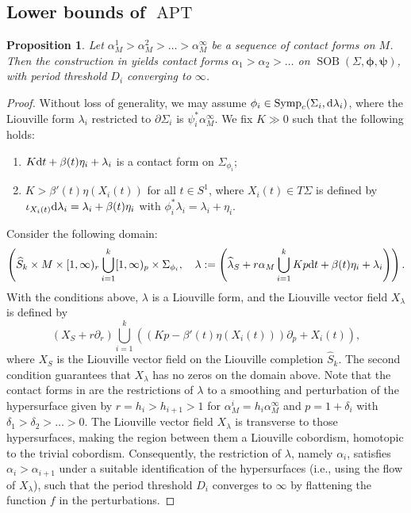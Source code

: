 \documentclass[11pt]{amsart}
\numberwithin{equation}{section}
\newtheorem{proposition}[theorem]{\textbf{Proposition}}
\def\rd{{\rm d}}
\DeclareMathOperator{\APT}{APT}
\DeclareMathOperator{\symp}{Symp}
\DeclareMathOperator{\SOB}{SOB}
\begin{document}
\subsection{Lower bounds of $\APT$}
\begin{proposition}\label{prop:filtration}
    Let $\alpha^1_M>\alpha^2_M>\ldots >\alpha^\infty_M$ be a sequence of contact forms on $M$. Then the construction in  yields contact forms $\alpha_1>\alpha_2>\ldots$ on $\SOB(\Sigma,\bm{\phi},\bm{\psi})$, with period threshold $D_i$ converging to $\infty$.
\end{proposition}
\begin{proof}
    Without loss of generality, we may assume $\phi_i\in \symp_c(\Sigma_i,\rd \lambda_i)$, where the Liouville form $\lambda_i$ restricted to $\partial \Sigma_i$ is $\psi_i^*\alpha^{\infty}_M$. We fix $K\gg 0$ such that the following holds:
    \begin{enumerate}
        \item $K\rd t + \beta(t)\eta_i+\lambda_i$ is a contact form on $\Sigma_{\phi_i}$;
        \item $K>\beta'(t)\eta(X_i(t))$ for all $t\in S^1$, where $X_i(t)\in T\Sigma$ is defined by $\iota_{X_i(t)}\rd \lambda_i=\lambda_i+\beta(t)\eta_i$ with $\phi_i^*\lambda_i=\lambda_i+\eta_i$.
    \end{enumerate}
    Consider the following domain:
    $$\left(\widehat{S}_k \times M\times [1,\infty)_r \bigcup_{i=1}^k [1,\infty)_p \times \Sigma_{\phi_i}, \quad \lambda:=\left(\widehat{\lambda}_S+r\alpha_M \bigcup_{i=1}^k Kp\rd t + \beta(t)\eta_i+\lambda_i\right)\right).$$
    With the conditions above, $\lambda$ is a Liouville form, and the Liouville vector field $X_\lambda$ is defined by 
    $$\left(X_S+r\partial_r\right) \bigcup_{i=1}^k \left((Kp-\beta'(t)\eta(X_i(t)))\partial_p+X_i(t)\right),$$
    where $X_S$ is the Liouville vector field on the Liouville completion $\widehat{S}_k$. The second condition guarantees that $X_{\lambda}$ has no zeros on the domain above. Note that the contact forms in  are the restrictions of $\lambda$ to a smoothing and perturbation of the hypersurface given by $r=h_i>h_{i+1}>1$ for $\alpha^i_M=h_i\alpha^{\infty}_M$ and $p=1+\delta_i$ with $\delta_1>\delta_2>\ldots >0$. The Liouville vector field $X_\lambda$ is transverse to those hypersurfaces, making the region between them a Liouville cobordism, homotopic to the trivial cobordism. Consequently, the restriction of $\lambda$, namely $\alpha_i$, satisfies $\alpha_i>\alpha_{i+1}$ under a suitable identification of the hypersurfaces (i.e., using the flow of $X_{\lambda}$), such that the period threshold $D_i$ converges to $\infty$ by flattening the function $f$ in the perturbations.
\end{proof}
\end{document}
